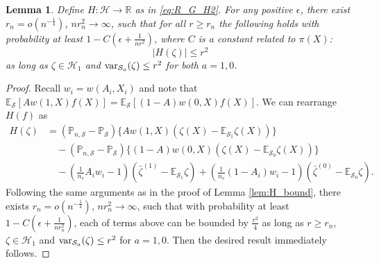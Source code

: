 \documentclass[12pt]{article}
\newtheorem{lemma}{Lemma}
\newcommand{\E}{\mathbb{E}}
\newcommand{\prob}{\mathbb{P}}
\newcommand{\var}{\textnormal{var}}
\begin{document}
\begin{lemma}
	\label{lem:H_bound2}
	Define $H: \mathcal{H} \rightarrow \mathbb{R}$ as in \eqref{eq:R_G_H2}. For any positive $\epsilon$, there exist $r_n = o(n^{-\frac{1}{4}})$, $n r_n^2 \rightarrow \infty$, such that for all $r \ge r_n$ the following holds with probability at least $1 - C(\epsilon + \frac{1}{n r^2})$, where $C$ is a constant related to $\pi(X)$:
	\begin{equation*}
		|H(\zeta)| \le r^2
	\end{equation*}
	as long as $\zeta \in \mathcal{H}_1$ and $\var_{\mathcal{S}_a}(\zeta) \le r^2$ for both $a = 1, 0$.
\end{lemma}
\begin{proof}
	Recall $w_i = w(A_i, X_i)$ and note that $\E_\mathcal{S}[A w(1, X) f(X)] = \E_\mathcal{S}[(1-A) w(0, X) f(X)]$. We can rearrange $H(f)$ as
	\begin{equation}
		\label{eq:H_bound2_terms}
		\begin{aligned}
			H(\zeta) &=
			(\prob_{n, \mathcal{S}} - \prob_{\mathcal{S}})\{Aw(1, X)(\zeta(X) - \E_{\mathcal{S}_1} \zeta(X))\}
			\\&\quad-
			(\prob_{n, \mathcal{S}} - \prob_{\mathcal{S}})\{(1-A)w(0, X)(\zeta(X) - \E_{\mathcal{S}_0} \zeta(X))\}
			\\&\quad-
			(\frac{1}{n_s} A_i w_i - 1) (\bar{\zeta}^{(1)} - \E_{\mathcal{S}_1}\zeta) +
			(\frac{1}{n_s} (1-A_i) w_i - 1) (\bar{\zeta}^{(0)} - \E_{\mathcal{S}_0}\zeta)
			.\end{aligned}
	\end{equation}
	Following the same arguments as in the proof of Lemma \ref{lem:H_bound}, there exists $r_n = o(n^{-\frac{1}{4}})$, $n r_n^2 \rightarrow \infty$, such that with probability at least $1 - C(\epsilon + \frac{1}{n r_n^2})$, each of terms above can be bounded by $\frac{r^2}{4}$ as long as $r \ge r_n$, $\zeta \in \mathcal{H}_1$ and $\var_{\mathcal{S}_a}(\zeta) \le r^2$ for $a = 1, 0$. Then the desired result immediately follows.
\end{proof}
\end{document}
